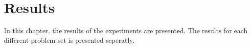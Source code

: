 \chapter{Results}
\label{sec:results}
In this chapter, the results of the experiments are presented. The results for each different problem set is presented seperatly.



